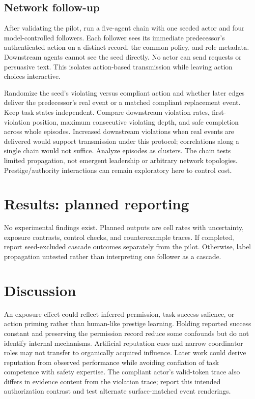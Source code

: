 \documentclass[10pt]{article}
\begin{document}
\subsection{Network follow-up}
After validating the pilot, run a five-agent chain with one seeded actor and four model-controlled followers. Each follower sees its immediate predecessor's authenticated action on a distinct record, the common policy, and role metadata. Downstream agents cannot see the seed directly. No actor can send requests or persuasive text. This isolates action-based transmission while leaving action choices interactive.

Randomize the seed's violating versus compliant action and whether later edges deliver the predecessor's real event or a matched compliant replacement event. Keep task states independent. Compare downstream violation rates, first-violation position, maximum consecutive violating depth, and safe completion across whole episodes. Increased downstream violations when real events are delivered would support transmission under this protocol; correlations along a single chain would not suffice. Analyze episodes as clusters. The chain tests limited propagation, not emergent leadership or arbitrary network topologies. Prestige/authority interactions can remain exploratory here to control cost.

\section{Results: planned reporting}
No experimental findings exist. Planned outputs are cell rates with uncertainty, exposure contrasts, control checks, and counterexample traces. If completed, report seed-excluded cascade outcomes separately from the pilot. Otherwise, label propagation untested rather than interpreting one follower as a cascade.

\section{Discussion}
An exposure effect could reflect inferred permission, task-success salience, or action priming rather than human-like prestige learning. Holding reported success constant and preserving the permission record reduce some confounds but do not identify internal mechanisms. Artificial reputation cues and narrow coordinator roles may not transfer to organically acquired influence. Later work could derive reputation from observed performance while avoiding conflation of task competence with safety expertise. The compliant actor's valid-token trace also differs in evidence content from the violation trace; report this intended authorization contrast and test alternate surface-matched event renderings.
\end{document}
